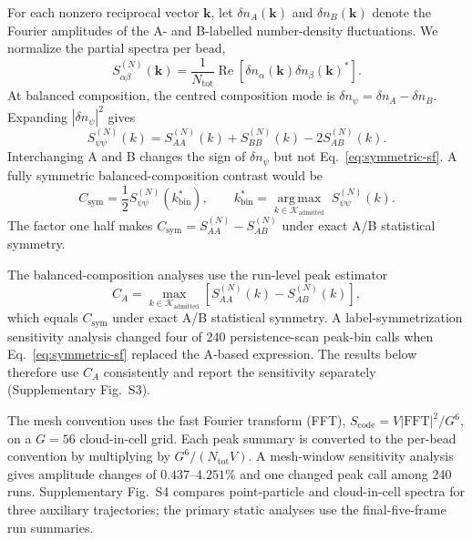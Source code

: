 \documentclass[pdflatex,sn-nature,onecolumn]{sn-jnl}
\begin{document}
For each nonzero reciprocal vector $\bm{k}$, let $\delta n_A(\bm{k})$ and $\delta n_B(\bm{k})$ denote the Fourier amplitudes of the A- and B-labelled number-density fluctuations. We normalize the partial spectra per bead,
\begin{equation}
S_{\alpha\beta}^{(N)}(\bm{k})=\frac{1}{N_{\mathrm{tot}}}
\operatorname{Re}\!\left[\delta n_\alpha(\bm{k})\delta n_\beta(\bm{k})^*\right].
\label{eq:partial-sf}
\end{equation}
At balanced composition, the centred composition mode is $\delta n_\psi=\delta n_A-\delta n_B$. Expanding $|\delta n_\psi|^2$ gives
\begin{equation}
S_{\psi\psi}^{(N)}(k)=S_{AA}^{(N)}(k)+S_{BB}^{(N)}(k)-2S_{AB}^{(N)}(k).
\label{eq:symmetric-sf}
\end{equation}
Interchanging A and B changes the sign of $\delta n_\psi$ but not Eq.~\ref{eq:symmetric-sf}. A fully symmetric balanced-composition contrast would be
\begin{equation}
C_{\mathrm{sym}}=\frac{1}{2}S_{\psi\psi}^{(N)}(k_{\mathrm{bin}}^*),\qquad
k_{\mathrm{bin}}^*=\underset{k\in\mathcal{K}_{\mathrm{admitted}}}{\operatorname{arg\,max}}\;S_{\psi\psi}^{(N)}(k).
\label{eq:contrast}
\end{equation}
The factor one half makes $C_{\mathrm{sym}}=S_{AA}^{(N)}-S_{AB}^{(N)}$ under exact A/B statistical symmetry.

The balanced-composition analyses use the run-level peak estimator
\begin{equation}
C_A=\max_{k\in\mathcal K_{\mathrm{admitted}}}
\left[S_{AA}^{(N)}(k)-S_{AB}^{(N)}(k)\right],
\label{eq:peak-estimator}
\end{equation}
which equals $C_{\mathrm{sym}}$ under exact A/B statistical symmetry. A label-symmetrization sensitivity analysis changed four of 240 persistence-scan peak-bin calls when Eq.~\ref{eq:symmetric-sf} replaced the A-based expression. The results below therefore use $C_A$ consistently and report the sensitivity separately (Supplementary Fig.~S3).

The mesh convention uses the fast Fourier transform (FFT), $S_{\mathrm{code}}=V|\mathrm{FFT}|^2/G^6$, on a $G=56$ cloud-in-cell grid. Each peak summary is converted to the per-bead convention by multiplying by $G^6/(N_{\mathrm{tot}}V)$. A mesh-window sensitivity analysis gives amplitude changes of $0.437$--$4.251\%$ and one changed peak call among 240 runs. Supplementary Fig.~S4 compares point-particle and cloud-in-cell spectra for three auxiliary trajectories; the primary static analyses use the final-five-frame run summaries.
\end{document}
